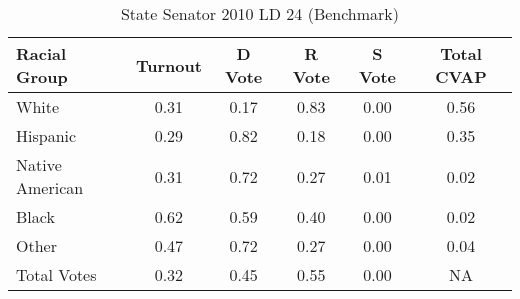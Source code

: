 \begin{table}[htb]
\begin{center}
\caption{State Senator 2010 LD 24 (Benchmark)}
\label{stsen10_cvap_ld_24_benchmark}
\begin{tabular}{lccccc}
  \hline
Racial Group & Turnout & D Vote & R Vote & S Vote & Total CVAP \\ 
  \hline
   White & 0.31  & 0.17  & 0.83  & 0.00  & 0.56 \\
    Hispanic & 0.29  & 0.82  & 0.18  & 0.00  & 0.35 \\
    Native American & 0.31  & 0.72  & 0.27  & 0.01  & 0.02 \\
    Black & 0.62  & 0.59  & 0.40  & 0.00  & 0.02 \\
    Other & 0.47  & 0.72  & 0.27  & 0.00  & 0.04 \\
    Total Votes & 0.32  & 0.45  & 0.55  & 0.00  &  NA \\
   \hline
\end{tabular}
\end{center}
\end{table}